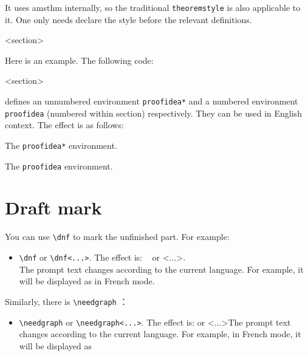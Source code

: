 \documentclass{simplivre}
\newenvironment{remind}[1][Remind]{%
    \LocallyStopLineNumbers%
    \begin{tcolorbox}[breakable,
        enhanced,
        width = \textwidth,
        colback = white, colbacktitle = paper,
        colframe = gray!50, boxrule=0.2mm,
        coltitle = black,
        fonttitle = \sffamily,
        attach boxed title to top left = {yshift=-\tcboxedtitleheight/2,  xshift=\tcboxedtitlewidth/4},
        boxed title style = {boxrule=0pt, colframe=paper},
        before skip = 0.3cm,
        after skip = 0.3cm,
        top = 3mm,
        bottom = 3mm,
        title={\sffamily #1}]%
}{\end{tcolorbox}\ResumeLineNumbers}
\begin{document}
\begin{remind}
    It uses \textsf{amsthm} internally, so the traditional \texttt{theoremstyle} is also applicable to it. One only needs declare the style before the relevant definitions.
\end{remind}

\def\proofideanameEN{Idea}
<section>

\bigskip
Here is an example. The following code:
\begin{code}
  \def\proofideanameEN{Idea}
  <section>
\end{code}
defines an unnumbered environment \lstinline|proofidea*| and a numbered environment \lstinline|proofidea| (numbered within section) respectively. They can be used in English context. The effect is as follows:

\begin{proofidea*}
    The \lstinline|proofidea*| environment.
\end{proofidea*}

\begin{proofidea}
    The \lstinline|proofidea| environment.
\end{proofidea}

\clearpage
\section{Draft mark}

You can use \lstinline|\dnf| to mark the unfinished part. For example:
\begin{itemize}
    \item \lstinline|\dnf| or \lstinline|\dnf<...>|. The effect is: \dnf~ or \dnf<...>. \\The prompt text changes according to the current language. For example, it will be displayed as  in French mode.
\end{itemize}

Similarly, there is \lstinline|\needgraph| ：
\begin{itemize}
    \item \lstinline|\needgraph| or \lstinline|\needgraph<...>|. The effect is: \needgraph or \needgraph<...>The prompt text changes according to the current language. For example, in French mode, it will be displayed as 
\end{itemize}
\end{document}
